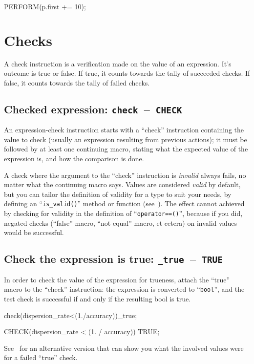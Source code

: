 \documentclass[twoside, a4paper, article]{memoir}
\newcommand*\testudocolor{\color{red!80!blue}}
\newcommand*\testudo[1]{\texttt{\testudocolor{}#1}}
\newcommand*\testudopair[2]{\testudo{#1}~--~\testudo{#2}}
\newcommand\subsectiontestudopair[3]{%
  \subsection[#1]{#1: \testudopair{#2}{#3}}}
\begin{document}
\begin{cpplisting}
PERFORM(p.first += 10);
\end{cpplisting}


\section{Checks}
\label{sec:checks}

A check instruction is a verification made on the value of an expression.  It's
outcome is true or false.  If true, it counts towards the tally of succeeded
checks.  If false, it counts towards the tally of failed checks.

\subsectiontestudopair{Checked expression}{check}{CHECK}
\label{sec:checked-expression}

An expression-check instruction starts with a ``check'' instruction containing
the value to check (usually an expression resulting from previous actions); it
must be followed by at least one continuing macro, stating what the expected
value of the expression is, and how the comparison is done.

A check where the argument to the ``check'' instruction is \emph{invalid}
always fails, no matter what the continuing macro says.  Values are considered
\emph{valid} by default, but you can tailor the definition of validity for a
type to suit your needs, by defining an ``\texttt{is\_valid()}'' method or
function (see~).  The effect cannot achieved by checking for
validity in the definition of ``\texttt{operator==()}'', because if you did,
negated checks (``false'' macro, ``not-equal'' macro, et cetera) on invalid
values would be successful.

\subsectiontestudopair{Check the expression is true}{\_true}{TRUE}
\label{sec:check-expression-true}

In order to check the value of the expression for trueness, attach the ``true''
macro to the ``check'' instruction: the expression is converted to
``\texttt{bool}'', and the test check is successful if and only if the
resulting bool is true.

\begin{cpplisting}
check(dispersion_rate<(1./accuracy))_true;
\end{cpplisting}

\begin{cpplisting}
CHECK(dispersion_rate < (1. / accuracy)) TRUE;
\end{cpplisting}

See~ for an alternative version that can
show you what the involved values were for a failed ``true'' check.
\end{document}
